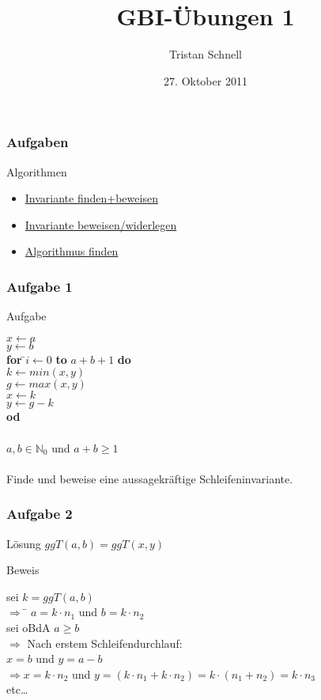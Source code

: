 \documentclass{beamer}
\author{Tristan Schnell}
\title{GBI-Übungen 1}
\date{27. Oktober 2011}
\begin{document}
\begin{frame}[label=start]
	\frametitle{Aufgaben}
	\begin{block}{Algorithmen}
		\begin{itemize}
			\item \hyperlink{1.1}{Invariante finden+beweisen}
			\item \hyperlink{1.2}{Invariante beweisen/widerlegen}
			\item \hyperlink{1.3}{Algorithmus finden}
		\end{itemize}
	\end{block}
\end{frame}

\begin{frame}[label=1.1]
	\frametitle{Aufgabe 1}
	\begin{block}{Aufgabe}
		
		\begin{tabbing}
			$x \leftarrow a$\\
			$y \leftarrow b$\\
			\textbf{for} \=$i \leftarrow 0$ \textbf{to} $a+b+1$ \textbf{do}\\
			\> $k \leftarrow min(x,y)$\\
			\> $g \leftarrow max(x,y)$\\
			\> $x \leftarrow k$\\
			\> $y \leftarrow g-k$\\
			\textbf{od}\\
			\\
			$a,b \in \mathbb{N}_0$ und $a + b \ge 1$\\
			\\
			Finde und beweise eine aussagekräftige Schleifeninvariante.
		\end{tabbing}
	\end{block}
\end{frame}

\begin{frame}
	\frametitle{Aufgabe 2}
	\begin{block}{Lösung}
		$ggT(a,b) = ggT(x,y)$
	\end{block}
	\begin{block}{Beweis}
		\begin{tabbing}
			\pause
			sei $k = ggT(a,b)$\\
			\pause
			$\Rightarrow$ \= $a = k\cdot n_1$ und $  b = k\cdot n_2$\\
			\pause
			sei oBdA $a \ge b$\\
			\pause
			$\Rightarrow$ Nach erstem Schleifendurchlauf:\\
			\pause
			\>$x=b$ und $ y=a-b$\\
			\pause
			$\Rightarrow x = k\cdot n_2 $ und $  y = (k\cdot n_1 + k\cdot n_2) = k \cdot (n_1+n_2) = k \cdot n_3$\\
			etc\dots
		\end{tabbing}
	\end{block}
	\hyperlink{start}{}
\end{frame}
\end{document}
